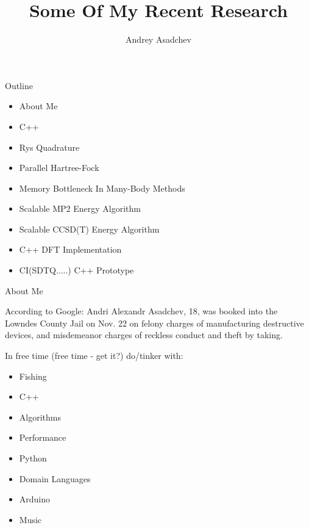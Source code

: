 \documentclass{beamer}
\title[Some Of My Research Into Algorithms]{Some Of My Recent Research}
\author{ Andrey Asadchev}
\institute{Iowa State University}
\begin{document}
\begin{frame}
  \titlepage
\end{frame}


\begin{frame}{Outline}
  \begin{itemize}
  \item About Me
  \item C++
  \item Rys Quadrature
  \item Parallel Hartree-Fock
  \item Memory Bottleneck In Many-Body Methods
  \item Scalable MP2 Energy Algorithm
  \item Scalable CCSD(T) Energy Algorithm
  \item C++ DFT Implementation
  \item CI(SDTQ.....) C++ Prototype
  \end{itemize}
\end{frame}

\begin{frame}{About Me}
  
According to Google: Andri Alexandr Asadchev, 18, was booked into the Lowndes County Jail
on Nov. 22 on felony charges of manufacturing destructive devices, and
misdemeanor charges of reckless conduct and theft by taking.

In free time (free time - get it?) do/tinker with:
  \begin{itemize}
  \item Fishing
  \item C++
  \item Algorithms
  \item Performance
  \item Python
  \item Domain Languages
  \item Arduino
  \item Music
  \end{itemize}
\end{frame}
\end{document}
